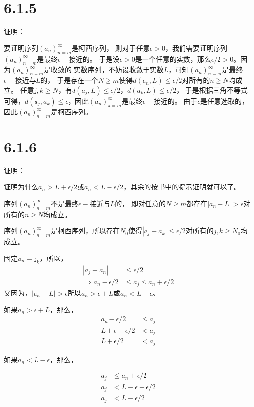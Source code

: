 \documentclass{article}
\theoremstyle{mystyle}
\begin{document}
\section*{6.1.5}

证明：

要证明序列$(a_n)_{n=m}^\infty$是柯西序列，
则对于任意$\epsilon>0$，我们需要证明序列$(a_n)_{n=m}^\infty$是最终$\epsilon -$接近的。
于是设$\epsilon > 0$是一个任意的实数，那么$\epsilon/2 > 0$。因为$(a_n)_{n=m}^\infty$是收敛的
实数序列，不妨设收敛于实数$L$，可知$(a_n)_{n=m}^\infty$是最终$\epsilon -$接近与$L$的，
于是存在一个$N \geq m$使得$d(a_n,L)\leq \epsilon/2$对所有的$n \geq N$均成立。
任意$j,k \geq N$，有$d(a_j,L)\leq \epsilon/2$，$d(a_k,L)\leq \epsilon/2$，
于是根据三角不等式可得，$d(a_j,a_k) \leq \epsilon$，因此$(a_n)_{n=m}^\infty$是最终$\epsilon -$接近的。
由于$\epsilon$是任意选取的，因此$(a_n)_{n=m}^\infty$是柯西序列。

\section*{6.1.6}

证明：

证明为什么$a_n > L + \epsilon / 2$或$a_n < L - \epsilon / 2$，其余的按书中的提示证明就可以了。

序列$(a_n)_{n=m}^\infty$不是最终$\epsilon -$接近与$L$的，
即对任意的$N \geq m$都存在$|a_n - L| > \epsilon$对所有的$n \geq N$均成立。

序列$(a_n)_{n=m}^\infty$是柯西序列，所以存在$N_0$使得$|a_j - a_k| \leq \epsilon/2$对所有的$j,k \geq N_0$均成立。

固定$a_n=j_k$，所以，
\begin{align*}
  |a_j - a_n|                  & \leq \epsilon/2                      \\
  \Rightarrow a_n - \epsilon/2 & \leq a_j       \leq a_n + \epsilon/2
\end{align*}
又因为，$|a_n - L| > \epsilon$所以$a_n > \epsilon + L$或$a_n < L - \epsilon$。

如果$a_n > \epsilon + L$，那么，
\begin{align*}
  a_n - \epsilon/2          & \leq a_j \\
  L + \epsilon - \epsilon/2 & < a_j    \\
  L + \epsilon/2            & < a_j
\end{align*}

如果$a_n < L - \epsilon$，那么，

\begin{align*}
  a_j & \leq a_n + \epsilon/2       \\
  a_j & < L - \epsilon + \epsilon/2 \\
  a_j & < L - \epsilon/2
\end{align*}
\end{document}
